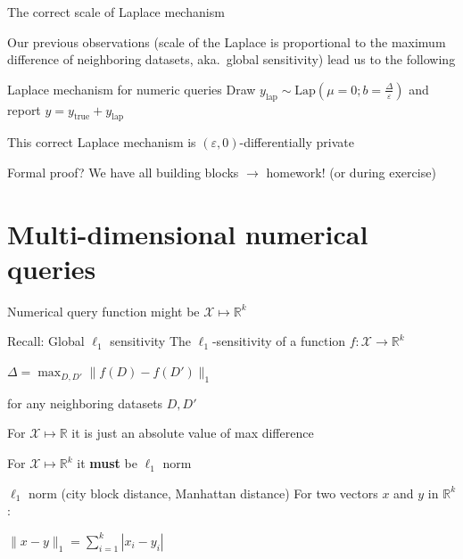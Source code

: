 \documentclass[12pt,aspectratio=169,handout]{beamer}
\begin{document}
\begin{frame}{The correct scale of Laplace mechanism}

Our previous observations (scale of the Laplace is proportional to the maximum difference of neighboring datasets, aka.\ global sensitivity) lead us to the following

\begin{block}{Laplace mechanism for numeric queries}
Draw $y_{\mathrm{lap}} \sim \textrm{Lap}(\mu = 0; b=\frac{\Delta}{\varepsilon})$ and report $y = y_{\mathrm{true}} + y_{\mathrm{lap}}$
\end{block}

This correct Laplace mechanism is $(\varepsilon, 0)$-differentially private

Formal proof? We have all building blocks $\rightarrow$ homework! (or during exercise)

\end{frame}


\section{Multi-dimensional numerical queries}

\begin{frame}{Numerical query function might be $\mathcal{X} \mapsto \mathbb{R}^k$}

\begin{block}{Recall: Global $\ell_1$ sensitivity}
The $\ell_1$-sensitivity of a function $f : \mathcal{X} \rightarrow \mathbb{R}^k$

$\Delta = \max_{D, D'} \| f(D) - f(D') \|_1$

for any neighboring datasets $D, D'$
\end{block}

For $\mathcal{X} \mapsto \mathbb{R}$ it is just an absolute value of max difference

For $\mathcal{X} \mapsto \mathbb{R}^k$ it \textbf{must} be $\ell_1$ norm

\begin{block}{$\ell_1$ norm (city block distance, Manhattan distance)}
For two vectors $x$ and $y$ in $\mathbb{R}^k$:

$\| x - y\|_1 = \sum_{i = 1}^{k} | x_i - y_i |$
\end{block}

\end{frame}
\end{document}
